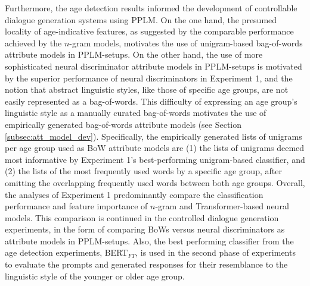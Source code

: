 Furthermore, the age detection results informed the development of controllable dialogue generation systems using PPLM. 
On the one hand, the presumed locality of age-indicative features, as suggested by the comparable performance achieved by the $n$-gram models, motivates the use of unigram-based bag-of-words attribute models in PPLM-setups.
On the other hand, the use of more sophisticated neural discriminator attribute models in PPLM-setups is motivated by the superior performance of neural discriminators in Experiment 1, and the notion that abstract linguistic styles, like those of specific age groups, are not easily represented as a bag-of-words.
This difficulty of expressing an age group's linguistic style as a manually curated bag-of-words motivates the use of empirically generated bag-of-words attribute models (see Section \ref{subsec:att_model_dev}).
Specifically, the empirically generated lists of unigrams per age group used as BoW attribute models are (1) the lists of unigrams deemed most informative by Experiment 1's best-performing unigram-based classifier, and (2) the lists of the most frequently used words by a specific age group, after omitting the overlapping frequently used words between both age groups.
Overall, the analyses of Experiment 1 predominantly compare the classification performance and feature importance of $n$-gram and Transformer-based neural models. This comparison is continued in the controlled dialogue generation experiments, in the form of comparing BoWs versus neural discriminators as attribute models in PPLM-setups. Also, the best performing classifier from the age detection experiments, BERT$_{FT}$, is used in the second phase of experiments to evaluate the prompts and generated responses for their resemblance to the linguistic style of the younger or older age group.

